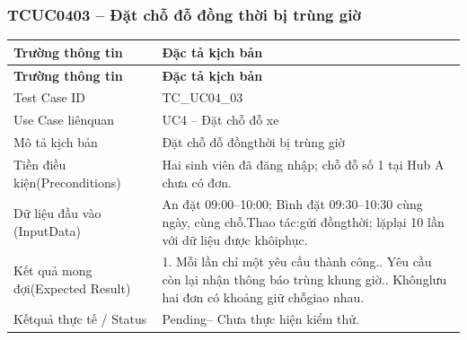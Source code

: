 \subsubsection{TCUC0403 – Đặt chỗ đỗ đồng thời bị trùng giờ}
\begin{longtable}{|L{0.24\textwidth}|L{0.70\textwidth}|}
\hline
\textbf{Trường thông tin} & \textbf{Đặc tả kịch bản} \\
\hline
\endfirsthead
\hline
\textbf{Trường thông tin} & \textbf{Đặc tả kịch bản} \\
\hline
\endhead
Test Case ID & TC\_UC04\_03 \\
\hline
Use Case liênquan & UC4 – Đặt chỗ đỗ xe \\
\hline
Mô tả kịch bản & Đặt chỗ đỗ đồngthời bị trùng giờ \\
\hline
Tiền điều kiện\newline (Preconditions) & Hai sinh viên đã đăng nhập; chỗ đỗ số 1 tại Hub A chưa có đơn. \\
\hline
Dữ liệu đầu vào (Input\newline Data) & An đặt 09:00–10:00; Bình đặt 09:30–10:30 cùng ngày, cùng chỗ.\newline Thao tác:gửi đồngthời; lặplại 10 lần với dữ liệu được khôiphục. \\
\hline
Kết quả mong đợi\newline (Expected Result) & 1. Mỗi lần chỉ một yêu cầu thành công.. Yêu cầu còn lại nhận thông báo trùng khung giờ.. Khônglưu hai đơn có khoảng giữ chỗgiao nhau. \\
\hline
Kếtquả thực tế / Status & Pending– Chưa thực hiện kiểm thử. \\
\hline
\end{longtable}
\vspace{-0.5\baselineskip}
